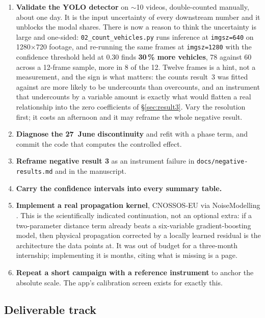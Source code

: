 \documentclass[11pt,a4paper]{article}
\newcommand{\pth}[1]{\texttt{\small #1}}
\begin{document}
\begin{enumerate}
 \item \textbf{Validate the YOLO detector} on \(\sim\)10 videos, double-counted
 manually, about one day. It is the input uncertainty of every
 downstream number and it unblocks the modal shares. There is now a
 reason to think the uncertainty is large and one-sided:
 \pth{02\_count\_vehicles.py} runs inference at
 \pth{imgsz=640} on 1280$\times$720 footage, and re-running the same
 frames at \pth{imgsz=1280} with the confidence threshold held at 0.30
 finds \textbf{30\,\% more vehicles}, 78 against 60 across a
 12-frame sample, more in 8 of the 12. Twelve frames is a hint, not a
 measurement, and the sign is what matters: the counts result~3 was
 fitted against are more likely to be undercounts than overcounts, and
 an instrument that undercounts by a variable amount is exactly what
 would flatten a real relationship into the zero coefficients of
 §\ref{sec:result3}. Vary the resolution first; it costs an afternoon
 and it may reframe the whole negative result.
 \item \textbf{Diagnose the 27~June discontinuity} and refit with a phase term, and commit the code that computes the controlled effect.
 \item \textbf{Reframe negative result 3} as an instrument failure in
 \pth{docs/negative-results.md} and in the manuscript.
 \item \textbf{Carry the confidence intervals into every summary table.}
 \item \textbf{Implement a real propagation kernel}, CNOSSOS-EU via
 NoiseModelling \citep{kephalopoulos2014cnossos, bocher2019noisemodelling}.
 This is the scientifically indicated continuation, not an optional
 extra: if a two-parameter distance term already beats a six-variable
 gradient-boosting model, then physical propagation corrected by a locally
 learned residual is the architecture the data points at. It was out of
 budget for a three-month internship; implementing it is months, citing
 what is missing is a page.
 \item \textbf{Repeat a short campaign with a reference instrument} to anchor
 the absolute scale. The app's calibration screen exists for exactly this.
\end{enumerate}

\subsection{Deliverable track}
\end{document}
